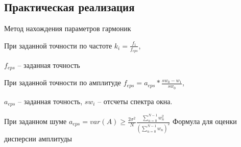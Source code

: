 \subsection{Практическая реализация}
\begin{frame}{Метод нахождения параметров гармоник}
	\begin{block}{При заданной точности по частоте}
		$k_i=\frac{f_1}{f_{eps}}$, 
		
		${f_{eps}}$ -- заданная точность
	\end{block}	
	\begin{block}{При заданной точности по амплитуде}
		$f_{eps}=a_{eps}*\frac{sw_0-w_1}{sw_0}$,  
		
		$a_{eps}$ -- заданная точность, $sw_i$ -- отсчеты спектра окна.
	\end{block}
	\begin{block}{При заданном шуме}
		$a_{eps} = var(A)\geq \frac{2\sigma^2}{N} \frac{\sum_{n=0}^{N-1}w_n^2}{\left(\sum_{n=0}^{N-1} w_n \right)^2}$ Формула для оценки дисперсии амплитуды
	\end{block}
\end{frame}

